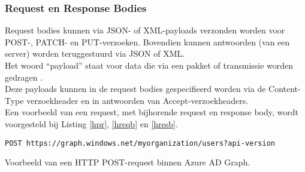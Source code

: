 \subsubsection{Request en Response Bodies}

Request bodies kunnen via \Ac{JSON}- of \ac{XML}-payloads verzonden worden voor POST-, PATCH- en PUT-verzoeken. Bovendien kunnen antwoorden (van een server) worden teruggestuurd via \ac{JSON} of \ac{XML}. \\

Het woord “payload” staat voor data die via een pakket of transmissie worden gedragen \autocite{Comer2006}. \\

Deze payloads kunnen in de request bodies gespecifieerd worden via de Content-Type verzoekheader en in antwoorden van Accept-verzoekheaders. \\

Een voorbeeld van een request, met bijhorende request en response body, wordt voorgesteld bij Listing \ref{hpr}, \ref{hreqb} en \ref{hresb}. \\

\begin{listing}[h]
\begin{verbatim}
POST https://graph.windows.net/myorganization/users?api-version
\end{verbatim}
\caption[Voorbeeld HTTP POST-request]{Voorbeeld van een \ac{HTTP} POST-request binnen Azure \ac{AD} Graph.}
\label{hpr}
\end{listing}


